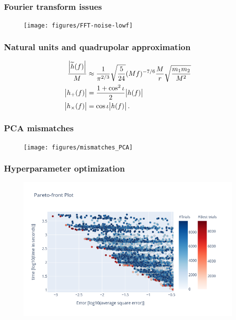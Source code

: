 \documentclass{beamer}
\begin{document}
\begin{frame}
    \frametitle{Fourier transform issues}
    \begin{figure}[ht]
    \centering
    \texttt{[image: figures/FFT-noise-lowf]}
    \label{fig:fft-noise-lowf}
    \end{figure}
\end{frame}

\begin{frame}
    \frametitle{Natural units and quadrupolar approximation}
    \begin{align}
    \frac{\abs{\widetilde{h}(f)}}{M} &\approx \frac{1}{\pi^{2/3}} \sqrt{\frac{5}{24}} (Mf)^{-7/6} \frac{M}{r} \sqrt{\frac{m_1 m_2 }{M^2}} \\
    \abs{h_{+}(f)} &= \frac{1 + \cos^2 \iota }{2} \abs{h (f)} \\
    \abs{h_{ \times }(f)} &= \cos \iota  \abs{h (f)}
    \,.
    \end{align}
\end{frame}


\begin{frame}
    \frametitle{PCA mismatches}
    \begin{figure}[ht]
    \centering
    \texttt{[image: figures/mismatches\_PCA]}
    \label{fig:mismatches_PCA}
    \end{figure}
\end{frame}

\begin{frame}
    \frametitle{Hyperparameter optimization}
    \begin{figure}[ht]
    \centering
    \includegraphics[width=\textwidth]{figures/pareto-front}
    \label{fig:pareto-front-nonspinning}
    \end{figure}
\end{frame}
\end{document}
